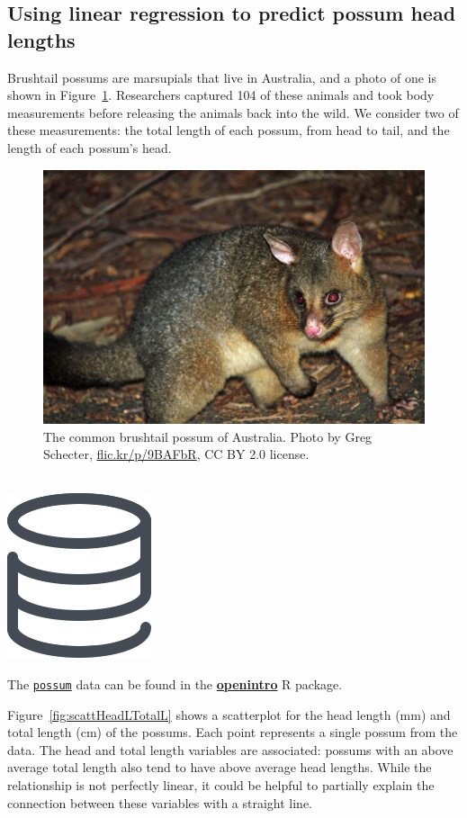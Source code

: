 \documentclass[
  10pt,
  openany]{book}
\newenvironment{mdframedwithfootTipDataPro}
{   
    \savenotes
    \begin{mdframed}[%
    topline=true, bottomline=true, linecolor=oiGray, linewidth=0.5pt,
    rightline=false, leftline=false,
    backgroundcolor=oiLGray]
    \renewcommand{\thempfootnote}{\arabic{footnote}}
    }
{
    \end{mdframed}
    \spewnotes
}
\newenvironment{data}{
\vspace{4mm}
\begin{mdframedwithfootTipDataPro}
\begin{minipage}[t]{0.10\textwidth}
{$\:$ \\ \setkeys{Gin}{width=2em,keepaspectratio}\includegraphics{images/_icons/data.png}}
\end{minipage}
\hfill
\begin{minipage}[t]{0.90\textwidth}
\vspace{-2mm}
\setlength{\parskip}{1em}
}{\end{minipage}
\end{mdframedwithfootTipDataPro}
\vspace{4mm}
}
\begin{document}
\hypertarget{using-linear-regression-to-predict-possum-head-lengths}{%
\subsection{Using linear regression to predict possum head lengths}\label{using-linear-regression-to-predict-possum-head-lengths}}

Brushtail possums are marsupials that live in Australia, and a photo of one is shown in Figure~\ref{fig:brushtail-possum}.
Researchers captured 104 of these animals and took body measurements before releasing the animals back into the wild.
We consider two of these measurements: the total length of each possum, from head to tail, and the length of each possum's head.

\begin{figure}[h]

{\centering \includegraphics[width=0.5\linewidth]{images/brushtail-possum/brushtail-possum} 

}

\caption{The common brushtail possum of Australia. Photo by Greg Schecter, \href{https://flic.kr/p/9BAFbR}{flic.kr/p/9BAFbR}, CC BY 2.0 license.}\label{fig:brushtail-possum}
\end{figure}



\begin{data}
The \href{http://openintrostat.github.io/openintro/reference/possum.html}{\texttt{possum}} data can be found in the \href{http://openintrostat.github.io/openintro}{\textbf{openintro}} R package.

\end{data}

Figure~\ref{fig:scattHeadLTotalL} shows a scatterplot for the head length (mm) and total length (cm) of the possums.
Each point represents a single possum from the data.
The head and total length variables are associated: possums with an above average total length also tend to have above average head lengths.
While the relationship is not perfectly linear, it could be helpful to partially explain the connection between these variables with a straight line.
\end{document}
